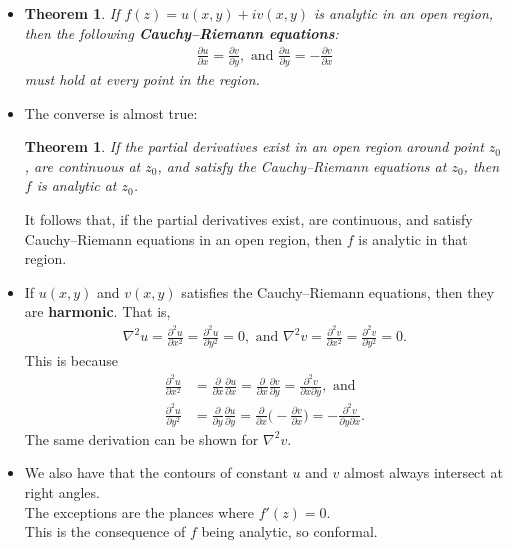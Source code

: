\documentclass[10pt]{article}
\newtheorem{theorem}[lemma]{Theorem}
\begin{document}
  \begin{itemize}
    \item 
    \begin{theorem}
    If $f(z) = u(x,y) + iv(x,y)$ is analytic in an open region, then the following {\bf Cauchy--Riemann equations}:
    \begin{align*}
      \frac{\partial u}{\partial x} = \frac{\partial v}{\partial y},\mbox{ and } \frac{\partial u}{\partial y} = -\frac{\partial v}{\partial x}
    \end{align*}
    must hold at every point in the region.  
    \end{theorem}
    

    \item The converse is almost true:
    \begin{theorem}
      If the partial derivatives exist in an open region around point $z_0$, are continuous at $z_0$, and satisfy the Cauchy--Riemann equations at $z_0$, then $f$ is analytic at $z_0$.
    \end{theorem}
    It follows that, if the partial derivatives exist, are continuous, and satisfy Cauchy--Riemann equations in an open region, then $f$ is analytic in that region.

    \item If $u(x,y)$ and $v(x,y)$ satisfies the Cauchy--Riemann equations, then they are {\bf harmonic}. That is,
    \begin{align*}
      \nabla^2 u = \frac{\partial^2 u}{\partial x^2} = \frac{\partial^2 u}{\partial y^2} = 0, \mbox{ and } \nabla^2 v = \frac{\partial^2 v}{\partial x^2} = \frac{\partial^2 v}{\partial y^2} = 0.
    \end{align*}
    This is because
    \begin{align*}
      \frac{\partial^2 u}{\partial x^2} &= \frac{\partial}{\partial x} \frac{\partial u}{\partial x} = \frac{\partial}{\partial x} \frac{\partial v}{\partial y} = \frac{\partial^2 v}{\partial x\partial y}, \mbox{ and}\\
      \frac{\partial^2 u}{\partial y^2} &= \frac{\partial}{\partial y} \frac{\partial u}{\partial y} = \frac{\partial}{\partial x} \bigg( -\frac{\partial v}{\partial x} \bigg) = -\frac{\partial^2 v}{\partial y\partial x}.
    \end{align*}
    The same derivation can be shown for $\nabla^2 v$.

    \item We also have that the contours of constant $u$ and $v$ almost always intersect at right angles.\\
    The exceptions are the plances where $f'(z) = 0.$\\
    This is the consequence of $f$ being analytic, so conformal.


\end{itemize}
\end{document}
